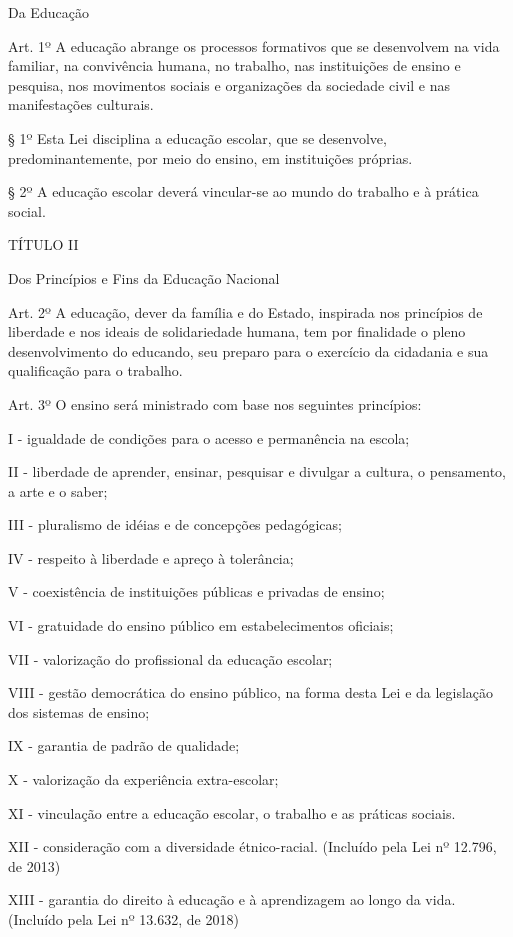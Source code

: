 \documentclass[
]{book}
\begin{document}
Da Educação

Art. 1º A educação abrange os processos formativos que se desenvolvem na vida familiar, na convivência humana, no trabalho, nas instituições de ensino e pesquisa, nos movimentos sociais e organizações da sociedade civil e nas manifestações culturais.

§ 1º Esta Lei disciplina a educação escolar, que se desenvolve, predominantemente, por meio do ensino, em instituições próprias.

§ 2º A educação escolar deverá vincular-se ao mundo do trabalho e à prática social.

TÍTULO II

Dos Princípios e Fins da Educação Nacional

Art. 2º A educação, dever da família e do Estado, inspirada nos princípios de liberdade e nos ideais de solidariedade humana, tem por finalidade o pleno desenvolvimento do educando, seu preparo para o exercício da cidadania e sua qualificação para o trabalho.

Art. 3º O ensino será ministrado com base nos seguintes princípios:

I - igualdade de condições para o acesso e permanência na escola;

II - liberdade de aprender, ensinar, pesquisar e divulgar a cultura, o pensamento, a arte e o saber;

III - pluralismo de idéias e de concepções pedagógicas;

IV - respeito à liberdade e apreço à tolerância;

V - coexistência de instituições públicas e privadas de ensino;

VI - gratuidade do ensino público em estabelecimentos oficiais;

VII - valorização do profissional da educação escolar;

VIII - gestão democrática do ensino público, na forma desta Lei e da legislação dos sistemas de ensino;

IX - garantia de padrão de qualidade;

X - valorização da experiência extra-escolar;

XI - vinculação entre a educação escolar, o trabalho e as práticas sociais.

XII - consideração com a diversidade étnico-racial. (Incluído pela Lei nº 12.796, de 2013)

XIII - garantia do direito à educação e à aprendizagem ao longo da vida. (Incluído pela Lei nº 13.632, de 2018)
\end{document}
